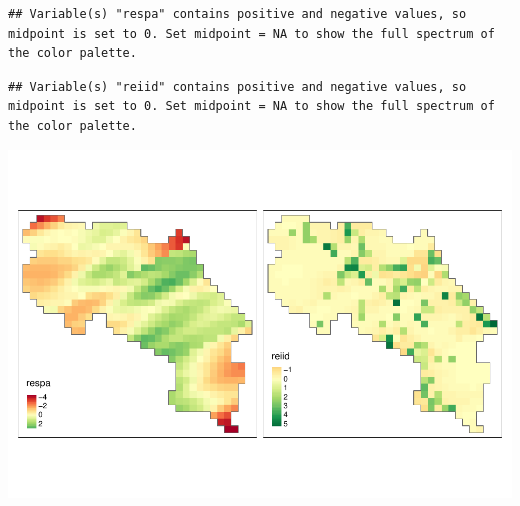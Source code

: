 \documentclass[
]{article}
\begin{document}
\begin{verbatim}
## Variable(s) "respa" contains positive and negative values, so midpoint is set to 0. Set midpoint = NA to show the full spectrum of the color palette.
\end{verbatim}

\begin{verbatim}
## Variable(s) "reiid" contains positive and negative values, so midpoint is set to 0. Set midpoint = NA to show the full spectrum of the color palette.
\end{verbatim}

\includegraphics{hw4_files/figure-latex/unnamed-chunk-5-1.pdf}
\end{document}
